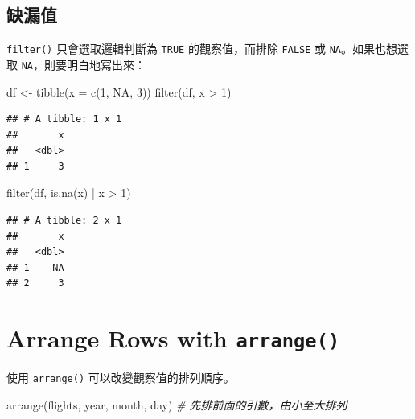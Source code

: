 \documentclass[
]{book}
\newenvironment{Shaded}{\begin{snugshade}}{\end{snugshade}}
\newcommand{\AttributeTok}[1]{\textcolor[rgb]{0.77,0.63,0.00}{#1}}
\newcommand{\CommentTok}[1]{\textcolor[rgb]{0.56,0.35,0.01}{\textit{#1}}}
\newcommand{\ConstantTok}[1]{\textcolor[rgb]{0.00,0.00,0.00}{#1}}
\newcommand{\DecValTok}[1]{\textcolor[rgb]{0.00,0.00,0.81}{#1}}
\newcommand{\FunctionTok}[1]{\textcolor[rgb]{0.00,0.00,0.00}{#1}}
\newcommand{\NormalTok}[1]{#1}
\newcommand{\OtherTok}[1]{\textcolor[rgb]{0.56,0.35,0.01}{#1}}
\newcommand{\SpecialCharTok}[1]{\textcolor[rgb]{0.00,0.00,0.00}{#1}}
\theoremstyle{definition}
\theoremstyle{remark}
\begin{document}
\hypertarget{ux7f3aux6f0fux503c}{%
\subsection{缺漏值}\label{ux7f3aux6f0fux503c}}

\texttt{filter()} 只會選取邏輯判斷為 \texttt{TRUE} 的觀察值，而排除 \texttt{FALSE} 或 \texttt{NA}。如果也想選取 \texttt{NA}，則要明白地寫出來：

\begin{Shaded}
\begin{Highlighting}[]
\NormalTok{df }\OtherTok{\textless{}{-}} \FunctionTok{tibble}\NormalTok{(}\AttributeTok{x =} \FunctionTok{c}\NormalTok{(}\DecValTok{1}\NormalTok{, }\ConstantTok{NA}\NormalTok{, }\DecValTok{3}\NormalTok{))}
\FunctionTok{filter}\NormalTok{(df, x }\SpecialCharTok{\textgreater{}} \DecValTok{1}\NormalTok{)}
\end{Highlighting}
\end{Shaded}

\begin{verbatim}
## # A tibble: 1 x 1
##       x
##   <dbl>
## 1     3
\end{verbatim}

\begin{Shaded}
\begin{Highlighting}[]
\FunctionTok{filter}\NormalTok{(df, }\FunctionTok{is.na}\NormalTok{(x) }\SpecialCharTok{|}\NormalTok{ x }\SpecialCharTok{\textgreater{}} \DecValTok{1}\NormalTok{)}
\end{Highlighting}
\end{Shaded}

\begin{verbatim}
## # A tibble: 2 x 1
##       x
##   <dbl>
## 1    NA
## 2     3
\end{verbatim}

\hypertarget{arrange}{%
\section{\texorpdfstring{Arrange Rows with \texttt{arrange()}}{Arrange Rows with arrange()}}\label{arrange}}

使用 \texttt{arrange()} 可以改變觀察值的排列順序。

\begin{Shaded}
\begin{Highlighting}[]
\FunctionTok{arrange}\NormalTok{(flights, year, month, day)  }\CommentTok{\# 先排前面的引數，由小至大排列}
\end{Highlighting}
\end{Shaded}
\end{document}
